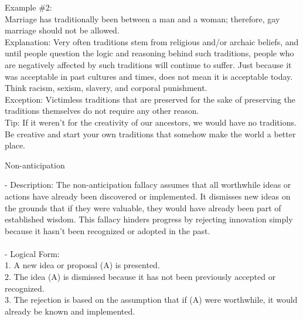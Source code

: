 \documentclass[a4paper,12pt,single,pdftex]{scrbook}
\begin{document}
{    
      Example \#2:
    \\

    
      Marriage has traditionally been between a man and a woman; therefore, gay marriage should not be allowed.
    \\

    
      Explanation:  Very often traditions stem from religious and/or archaic beliefs, and until people question the logic and reasoning behind such traditions, people who are negatively affected by such traditions will continue to suffer.  Just because it was acceptable in past cultures and times, does not mean it is acceptable today.  Think racism, sexism, slavery, and corporal punishment.
    \\

    
      Exception: Victimless traditions that are preserved for the sake of preserving the traditions themselves do not require any other reason.
    \\

    
      Tip: If it weren’t for the creativity of our ancestors, we would have no traditions.  Be creative and start your own traditions that somehow make the world a better place.
    \\

  }


Non-anticipation
    
      - Description: The non-anticipation fallacy assumes that all worthwhile ideas or actions have already been discovered or implemented. It dismisses new ideas on the grounds that if they were valuable, they would have already been part of established wisdom. This fallacy hinders progress by rejecting innovation simply because it hasn't been recognized or adopted in the past.
    \\

    
      
    \\

    
      - Logical Form:
    \\

    
        1. A new idea or proposal (A) is presented.
    \\

    
        2. The idea (A) is dismissed because it has not been previously accepted or recognized.
    \\

    
        3. The rejection is based on the assumption that if (A) were worthwhile, it would already be known and implemented.
    \\
\end{document}
